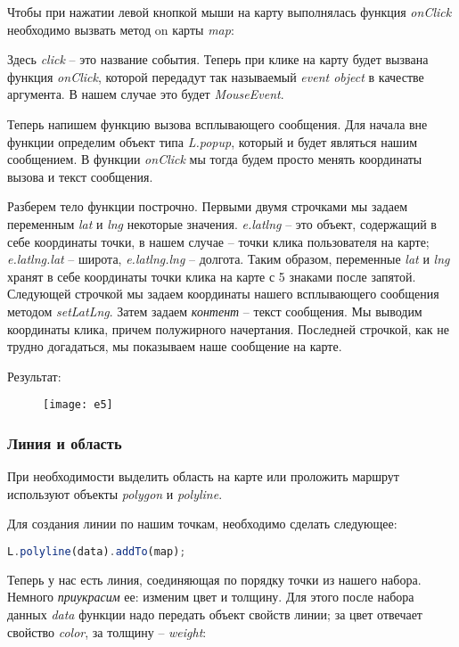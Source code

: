 Чтобы при нажатии левой кнопкой мыши на карту выполнялась функция 
\emph{onClick} необходимо вызвать метод on карты \emph{map}:


Здесь \emph{click} -- это название события. Теперь при клике на карту будет 
вызвана функция \emph{onClick}, которой передадут так называемый 
\emph{event object} в качестве аргумента. В нашем случае это будет 
\emph{MouseEvent}.

Теперь напишем функцию вызова всплывающего сообщения. Для начала вне функции 
определим объект типа \emph{L.popup}, который и будет являться нашим 
сообщением. В функции \emph{onClick} мы тогда будем просто менять координаты 
вызова и текст сообщения.



Разберем тело функции построчно. Первыми двумя строчками мы задаем 
переменным \emph{lat} и \emph{lng} некоторые значения. \emph{e.latlng} -- это 
объект, содержащий в себе координаты точки, в нашем случае -- точки клика 
пользователя на карте; \emph{e.latlng.lat} -- широта, \emph{e.latlng.lng} -- 
долгота. Таким образом, переменные \emph{lat} и \emph{lng} хранят в себе 
координаты точки клика на карте с 5 знаками после запятой. Следующей строчкой 
мы задаем координаты нашего всплывающего сообщения методом \emph{setLatLng}. 
Затем задаем \emph{контент} -- текст сообщения. Мы выводим координаты клика, 
причем полужирного начертания. Последней строчкой, как не трудно догадаться, 
мы показываем наше сообщение на карте.

Результат:
\begin{figure}[ht!]
    \center
    \texttt{[image: e5]}
\end{figure}

\subsubsection{Линия и область}
При необходимости выделить область на карте или проложить маршрут используют 
объекты \emph{polygon} и \emph{polyline}.

Для создания линии по нашим точкам, необходимо сделать следующее:
\begin{lstlisting}[language=js]
    L.polyline(data).addTo(map);
\end{lstlisting}

Теперь у нас есть линия, соединяющая по порядку точки из нашего набора. 
Немного \emph{приукрасим} ее: изменим цвет и толщину. Для этого после набора 
данных \emph{data} функции надо передать объект свойств линии; за цвет отвечает 
свойство \emph{color}, за толщину -- \emph{weight}:



